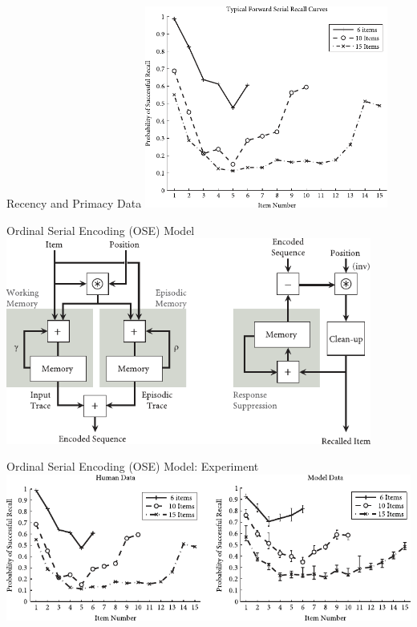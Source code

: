 \documentclass[handout,aspectratio=169]{beamer}
\begin{document}
	\begin{frame}{Recency and Primacy Data}
		\centering
		\includegraphics[width=0.6\textwidth]{media/htbab_recall_accuracy_jahnke.pdf}
	\end{frame}

	\begin{frame}{Ordinal Serial Encoding (OSE) Model}
		\centering
		\includegraphics[width=0.9\textwidth]{media/htbab_ose.pdf}
	\end{frame}

	\begin{frame}{Ordinal Serial Encoding (OSE) Model: Experiment}
		\centering
		\includegraphics[width=\textwidth]{media/htbab_ose_experiment.pdf}
	\end{frame}
\end{document}
